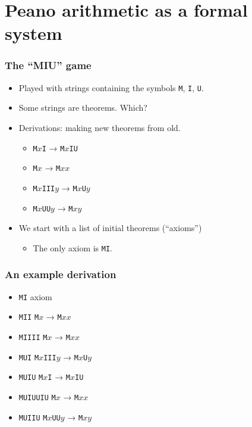 \documentclass[mathserif]{beamer}
\begin{document}
\section{Peano arithmetic as a formal system}
\label{sec-2}
\begin{frame}
\frametitle{The ``MIU'' game}
\label{sec-2-1}

\pause
\begin{itemize}

\item Played with strings containing the symbols \texttt{M}, \texttt{I}, \texttt{U}.\pause\\
\label{sec-2-1-1}%
\item Some strings are theorems. Which?\pause\\
\label{sec-2-1-2}%
\item Derivations: making new theorems from old.\pause
\label{sec-2-1-3}%
\begin{itemize}

\item \texttt{M$x$I} → \texttt{M$x$IU}\pause\\
\label{sec-2-1-3-1}%
\item \texttt{M$x$} → \texttt{M$xx$}\pause\\
\label{sec-2-1-3-2}%
\item \texttt{M$x$III$y$} → \texttt{M$x$U$y$}\pause\\
\label{sec-2-1-3-3}%
\item \texttt{M$x$UU$y$} → \texttt{M$xy$}\pause\\
\label{sec-2-1-3-4}%
\end{itemize} %

\item We start with a list of initial theorems (``axioms'')\pause
\label{sec-2-1-4}%
\begin{itemize}

\item The only axiom is \texttt{MI}.\\
\label{sec-2-1-4-1}%
\end{itemize} %
\end{itemize} %
\end{frame}
\begin{frame}
\frametitle{An example derivation}
\label{sec-2-2}

\pause
\begin{itemize}
\item \texttt{MI} \hfill axiom\pause
\item \texttt{MII} \hfill \texttt{M$x$} → \texttt{M$xx$}\pause
\item \texttt{MIIII} \hfill \texttt{M$x$} → \texttt{M$xx$}\pause
\item \texttt{MUI} \hfill \texttt{M$x$III$y$} → \texttt{M$x$U$y$}\pause
\item \texttt{MUIU} \hfill \texttt{M$x$I} → \texttt{M$x$IU}\pause
\item \texttt{MUIUUIU} \hfill \texttt{M$x$} → \texttt{M$xx$}\pause
\item \texttt{MUIIU} \hfill \texttt{M$x$UU$y$} → \texttt{M$xy$}
\end{itemize}
\end{frame}
\end{document}
